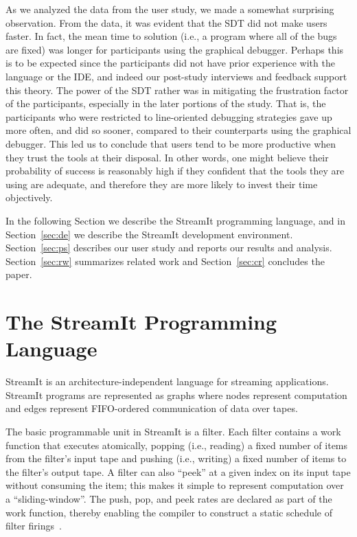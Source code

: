 \documentclass[11pt, letterpaper, onecolumn]{article}
\begin{document}
As  we analyzed  the data  from  the user  study, we  made a  somewhat
surprising observation.   From the data,  it was evident that  the SDT
did not make users faster. In fact, the mean time to solution (i.e., a
program where all  of the bugs are fixed)  was longer for participants
using the graphical debugger. Perhaps this is to be expected since the
participants did  not have prior  experience with the language  or the
IDE, and  indeed our post-study  interviews and feedback  support this
theory. The power of the  SDT rather was in mitigating the frustration
factor of  the participants, especially  in the later portions  of the
study. That is, the  participants who were restricted to line-oriented
debugging strategies gave  up more often, and did  so sooner, compared
to their  counterparts using the  graphical debugger.  This led  us to
conclude that  users tend  to be more  productive when they  trust the
tools  at their  disposal. In  other  words, one  might believe  their
probability of success  is reasonably high if they  confident that the
tools they are using are  adequate, and therefore they are more likely
to invest their time objectively.

In  the  following  Section   we  describe  the  StreamIt  programming
language,  and  in   Section~\ref{sec:de}  we  describe  the  StreamIt
development environment. Section~\ref{sec:ps} describes our user study
and reports our  results and analysis. Section~\ref{sec:rw} summarizes
related work and Section~\ref{sec:cr} concludes the paper.





\section{The StreamIt Programming Language}
\label{sec:pl}

StreamIt is an architecture-independent language for
streaming applications.   StreamIt programs are  represented as graphs
where  nodes represent  computation and  edges  represent FIFO-ordered
communication  of data  over tapes.  

The  basic programmable  unit in  StreamIt is  a filter.   Each filter
contains  a work  function that executes atomically,  popping (i.e.,
reading)  a fixed number  of items  from the  filter's input  tape and
pushing (i.e., writing) a fixed number of items to the filter's output
tape.  A filter  can also ``peek'' at a given index  on its input tape
without  consuming  the  item;  this  makes  it  simple  to  represent
computation over a ``sliding-window''.   The push, pop, and peek rates
are  declared as  part  of  the work  function,  thereby enabling  the
compiler    to    construct    a    static    schedule    of    filter
firings~\cite{lee87static}.
\end{document}
